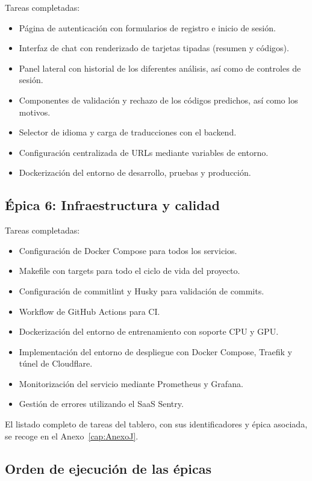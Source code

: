 Tareas completadas:
\begin{itemize}[noitemsep]
 \item Página de autenticación con formularios de registro e inicio de sesión.
 \item Interfaz de chat con renderizado de tarjetas tipadas (resumen y códigos).
 \item Panel lateral con historial de los diferentes análisis, así como de controles de sesión.
 \item Componentes de validación y rechazo de los códigos predichos, así como los motivos.
 \item Selector de idioma y carga de traducciones con el backend.
 \item Configuración centralizada de URLs mediante variables de entorno.
 \item Dockerización del entorno de desarrollo, pruebas y producción.
\end{itemize}

\subsection{Épica 6: Infraestructura y calidad}

Tareas completadas:
\begin{itemize}[noitemsep]
 \item Configuración de Docker Compose para todos los servicios.
 \item Makefile con targets para todo el ciclo de vida del proyecto.
 \item Configuración de commitlint y Husky para validación de commits.
 \item Workflow de GitHub Actions para CI.
 \item Dockerización del entorno de entrenamiento con soporte CPU y GPU.
 \item Implementación del entorno de despliegue con Docker Compose, Traefik y túnel de Cloudflare.
 \item Monitorización del servicio mediante Prometheus y Grafana.
 \item Gestión de errores utilizando el SaaS Sentry.
\end{itemize}

El listado completo de tareas del tablero, con sus identificadores y épica asociada, se recoge en el Anexo~\ref{cap:AnexoJ}.

\subsection{Orden de ejecución de las épicas}

